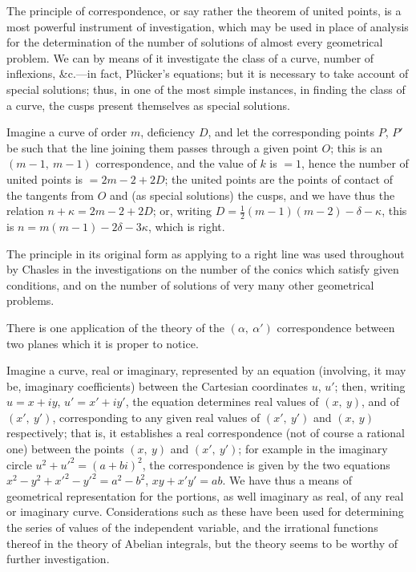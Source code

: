 \documentclass[12pt,a4paper,oneside]{book}
\begin{document}
The principle of correspondence, or say rather the theorem of united points, is a most powerful instrument of investigation, which may be used in place of analysis for the determination of the number of solutions of almost every geometrical problem. We can by means of it investigate the class of a curve, number of inflexions, \&c.---in fact, Pl\"ucker's equations; but it is necessary to take account of special solutions; thus, in one of the most simple instances, in finding the class of a curve, the cusps present themselves as special solutions.

\newpage
Imagine a curve of order $m$, deficiency $D$, and let the corresponding points $P$, $P'$ be such that the line joining them passes through a given point $O$; this is an $(m-1,\ m-1)$ correspondence, and the value of $k$ is $=1$, hence the number of united points is $=2m-2+2D$; the united points are the points of contact of the tangents from $O$ and (as special solutions) the cusps, and we have thus the relation $n+\kappa=2m-2+2D$; or, writing $D=\tfrac{1}{2}(m-1)(m-2)-\delta-\kappa$, this is $n=m(m-1)-2\delta-3\kappa$, which is right.

The principle in its original form as applying to a right line was used throughout by Chasles in the investigations on the number of the conics which satisfy given conditions, and on the number of solutions of very many other geometrical problems.

There is one application of the theory of the $(\alpha,\ \alpha')$ correspondence between two planes which it is proper to notice.

Imagine a curve, real or imaginary, represented by an equation (involving, it may be, imaginary coefficients) between the Cartesian coordinates $u$, $u'$; then, writing $u=x+iy$, $u'=x'+iy'$, the equation determines real values of $(x,\ y)$, and of $(x',\ y')$, corresponding to any given real values of $(x',\ y')$ and $(x,\ y)$ respectively; that is, it establishes a real correspondence (not of course a rational one) between the points $(x,\ y)$ and $(x',\ y')$; for example in the imaginary circle $u^{2}+u'^{2}=(a+bi)^{2}$, the correspondence is given by the two equations $x^{2}-y^{2}+x'^{2}-y'^{2}=a^{2}-b^{2}$, $xy+x'y'=ab$. We have thus a means of geometrical representation for the portions, as well imaginary as real, of any real or imaginary curve. Considerations such as these have been used for determining the series of values of the independent variable, and the irrational functions thereof in the theory of Abelian integrals, but the theory seems to be worthy of further investigation.
\end{document}
